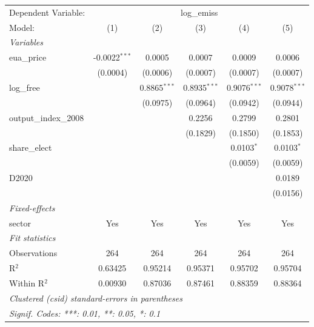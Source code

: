 
\begingroup
\centering
\begin{tabular}{lccccc}
   \tabularnewline \midrule \midrule
   Dependent Variable: & \multicolumn{5}{c}{log\_emiss}\\
   Model:                & (1)             & (2)            & (3)            & (4)            & (5)\\  
   \midrule
   \emph{Variables}\\
   eua\_price            & -0.0022$^{***}$ & 0.0005         & 0.0007         & 0.0009         & 0.0006\\   
                         & (0.0004)        & (0.0006)       & (0.0007)       & (0.0007)       & (0.0007)\\   
   log\_free             &                 & 0.8865$^{***}$ & 0.8935$^{***}$ & 0.9076$^{***}$ & 0.9078$^{***}$\\   
                         &                 & (0.0975)       & (0.0964)       & (0.0942)       & (0.0944)\\   
   output\_index\_2008   &                 &                & 0.2256         & 0.2799         & 0.2801\\   
                         &                 &                & (0.1829)       & (0.1850)       & (0.1853)\\   
   share\_elect          &                 &                &                & 0.0103$^{*}$   & 0.0103$^{*}$\\   
                         &                 &                &                & (0.0059)       & (0.0059)\\   
   D2020                 &                 &                &                &                & 0.0189\\   
                         &                 &                &                &                & (0.0156)\\   
   \midrule
   \emph{Fixed-effects}\\
   sector                & Yes             & Yes            & Yes            & Yes            & Yes\\  
   \midrule
   \emph{Fit statistics}\\
   Observations          & 264             & 264            & 264            & 264            & 264\\  
   R$^2$                 & 0.63425         & 0.95214        & 0.95371        & 0.95702        & 0.95704\\  
   Within R$^2$          & 0.00930         & 0.87036        & 0.87461        & 0.88359        & 0.88364\\  
   \midrule \midrule
   \multicolumn{6}{l}{\emph{Clustered (csid) standard-errors in parentheses}}\\
   \multicolumn{6}{l}{\emph{Signif. Codes: ***: 0.01, **: 0.05, *: 0.1}}\\
\end{tabular}
\par\endgroup


